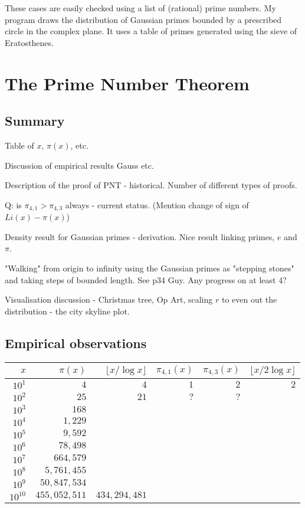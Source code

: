 \documentclass[a4paper]{article}
\begin{document}
These cases are easily checked using a list of (rational) prime numbers. 
My program draws the distribution of Gaussian primes bounded by a prescribed circle in the complex plane.
It uses a table of primes generated using the sieve of Eratosthenes. 

\section{The Prime Number Theorem}

\subsection{Summary}

Table of $x$, $\pi(x)$, etc.

Discussion of empirical results Gauss etc.

Description of the proof of PNT - historical. Number of different types of proofs.

Q: is $\pi_{4,1} > \pi_{4,3}$ always - current status. (Mention change of sign of $Li(x) - \pi(x)$)

Density result for Gaussian primes - derivation. Nice result linking primes, $e$ and $\pi$.

"Walking" from origin to infinity using the Gaussian primes as "stepping stones" and taking
steps of bounded length. See p34 Guy. Any progress on at least 4?

Visualisation discussion - Christmas tree, Op Art, scaling $r$ to even out the distribution - the
city skyline plot.

\subsection{Empirical observations}

\begin{tabular}{rrrrrr}
$x$       & $\pi(x)$    & $\lfloor x/\log x \rfloor$ & $\pi_{4,1}(x)$ & $\pi_{4,3}(x)$ & $\lfloor x/2\log x \rfloor$\\
\hline
$10^{1}$  & $4$         & $4$                       & $1$            & $2$            & $2$\\
$10^{2}$  & $25$        & $21$                      & $?$            & $?$\\
$10^{3}$  & $168$ \\
$10^{4}$  & $1,229$ \\
$10^{5}$  & $9,592$ \\
$10^{6}$  & $78,498$ \\
$10^{7}$  & $664,579$ \\
$10^{8}$  & $5,761,455$ \\
$10^{9}$  & $50,847,534$ \\
$10^{10}$ & $455,052,511$ & $434,294,481$\\
\end{tabular}
\end{document}
